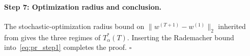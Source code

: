 \documentclass[letterpaper]{article}
\begin{document}
\paragraph{Step 7: Optimization radius and conclusion.}
The stochastic-optimization radius bound on $\|w^{(T+1)} - w^{(1)}\|_2$
inherited from \cite[Theorem~4.3]{tang2023towards} gives the three regimes
of $T^*_\alpha(T)$. Inserting the Rademacher bound into~\eqref{eq:pr_step1}
completes the proof. $\square$
\end{document}
